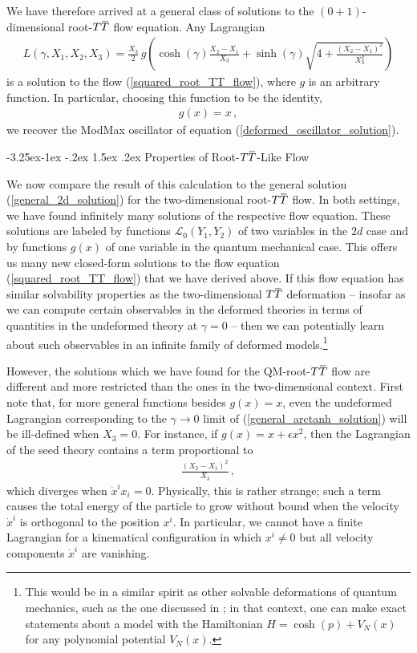\documentclass[12pt]{article}
\makeatletter
\numberwithin{equation}{section}
\renewcommand\subsection{\@startsection{subsection}{2}{\z@}%
                                     {-3.25ex\@plus -1ex \@minus -.2ex}%
                                     {1.5ex \@plus .2ex}%
                                     {\normalfont\bfseries}}
\newcommand{\overbar}[1]{\mkern 1.5mu\overline{\mkern-1.5mu#1\mkern-1.5mu}\mkern 1.5mu}
\def\TT{{T\overbar{T}}}
\makeatother
\begin{document}
We have therefore arrived at a general class of solutions to the $(0+1)$-dimensional root-$\TT$ flow equation. Any Lagrangian
%
\begin{align}\label{general_arctanh_solution}
    L ( \gamma , X_1, X_2, X_3 ) = \frac{X_3}{2} \, g \left( \cosh ( \gamma ) \frac{X_2 - X_1}{X_3} + \sinh ( \gamma ) \sqrt{ 4 + \frac{ \left( X_2 - X_1 \right)^2}{ X_3^2 } } \right)
\end{align}
%
is a solution to the flow (\ref{squared_root_TT_flow}), where $g$ is an arbitrary function. In particular, choosing this function to be the identity,
%
\begin{align}
    g ( x ) = x \, , 
\end{align}
%
we recover the ModMax oscillator of equation (\ref{deformed_oscillator_solution}).

\subsection{Properties of Root-$\TT$-Like Flow}\label{sec:properties_solutions}

We now compare the result of this calculation to the general solution (\ref{general_2d_solution}) for the two-dimensional root-$\TT$ flow. In both settings, we have found infinitely many solutions of the respective flow equation. These solutions are labeled by functions $\mathcal{L}_0 ( Y_1, Y_2 )$ of two variables in the $2d$ case and by functions $g ( x )$ of one variable in the quantum mechanical case. This offers us many new closed-form solutions to the flow equation (\ref{squared_root_TT_flow}) that we have derived above. If this flow equation has similar solvability properties as the two-dimensional $\TT$ deformation -- insofar as we can compute certain observables in the deformed theories in terms of quantities in the undeformed theory at $\gamma = 0$ -- then we can potentially learn about such observables in an infinite family of deformed models.\footnote{This would be in a similar spirit as other solvable deformations of quantum mechanics, such as the one discussed in \cite{Grassi:2018bci}; in that context, one can make exact statements about a model with the Hamiltonian $H = \cosh ( p ) + V_N ( x )$ for any polynomial potential $V_N ( x )$.}

However, the solutions which we have found for the QM-root-$\TT$ flow are different and more restricted than the ones in the two-dimensional context. First note that, for more general functions besides $g(x) = x$, even the undeformed Lagrangian corresponding to the $\gamma \to 0$ limit of (\ref{general_arctanh_solution}) will be ill-defined when $X_3 = 0$. For instance, if $g(x) = x + \epsilon x^2$, then the Lagrangian of the seed theory contains a term proportional to
%
\begin{align}
    \frac{ ( X_2 - X_1 )^2}{X_3} \, , 
\end{align}
%
which diverges when $\dot{x}^i x_i = 0$. Physically, this is rather strange; such a term causes the total energy of the particle to grow without bound when the velocity $\dot{x}^i$ is orthogonal to the position $x^i$. In particular, we cannot have a finite Lagrangian for a kinematical configuration in which $x^i \neq 0$ but all velocity components $\dot{x}^i$ are vanishing.
\end{document}
